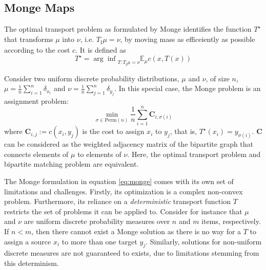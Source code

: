\subsection{Monge Maps}
The optimal transport problem as formulated by Monge identifies the function
$T^\star$ that transforms $\mu$ into $\nu$, i.e. $T_\sharp \mu = \nu$,
by moving mass as efficeiently as possible according to the cost $c$.
It is defined as
\begin{equation}
  T^\star = {\arg \inf}_{T : T_\sharp \mu = \nu} \mathbb{E}_\mu c(x, T(x))
  \label{eq:monge}
\end{equation}

Consider two uniform discrete probability distributions, $\mu$ and $\nu$, of size $n$,
$\mu = \frac{1}{n} \sum_{i=1}^n \delta_{x_i}$
and $\nu = \frac{1}{n} \sum_{j=1}^n \delta_{y_j}$.
In this special case, the Monge problem is an assignment problem: %
\begin{equation}
  \min_{\sigma \in \text{Perm}(n)} \frac{1}{n} \sum_{i=1}^{n} \mathbf{C}_{i,\sigma(i)}
\end{equation}
where $\mathbf{C}_{i,j} := c(x_i, y_j)$ is the cost to assign $x_i$ to $y_j$,
that is, $T^\star(x_i) = y_{\sigma(i)}$.
$\mathbf{C}$ can be considered as the weighted adjacency matrix of the bipartite graph that connects elements of $\mu$ to elements of $\nu$.
Here, the optimal transport problem and bipartite matching problem are equivalent.

The Monge formulation in equation \ref{eq:monge} comes with its own set of limitations and challenges.
Firstly, its optimization is a complex non-convex problem.
Furthermore, its reliance on a \emph{deterministic} transport function $T$ restricts the set of problems it can be applied to.
Consider for instance that $\mu$ and $\nu$ are uniform discrete probability measures over $n$ and $m$ items, respectively.
If $n < m$, then there cannot exist a Monge solution as there is no way for a $T$ to assign a source $x_i$ to more than one target $y_j$.
Similarly, solutions for non-uniform discrete measures are not guaranteed to exists,
due to limitations stemming from this determinism.

